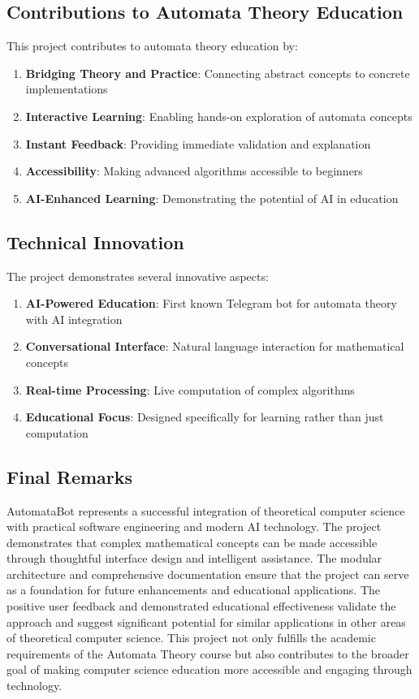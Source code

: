 \documentclass[12pt]{article}
\begin{document}
\subsection{Contributions to Automata Theory Education}
This project contributes to automata theory education by:
\begin{enumerate}
    \item \textbf{Bridging Theory and Practice}: Connecting abstract concepts to concrete implementations
    \item \textbf{Interactive Learning}: Enabling hands-on exploration of automata concepts
    \item \textbf{Instant Feedback}: Providing immediate validation and explanation
    \item \textbf{Accessibility}: Making advanced algorithms accessible to beginners
    \item \textbf{AI-Enhanced Learning}: Demonstrating the potential of AI in education
\end{enumerate}

\subsection{Technical Innovation}
The project demonstrates several innovative aspects:
\begin{enumerate}
    \item \textbf{AI-Powered Education}: First known Telegram bot for automata theory with AI integration
    \item \textbf{Conversational Interface}: Natural language interaction for mathematical concepts
    \item \textbf{Real-time Processing}: Live computation of complex algorithms
    \item \textbf{Educational Focus}: Designed specifically for learning rather than just computation
\end{enumerate}

\subsection{Final Remarks}
AutomataBot represents a successful integration of theoretical computer science with practical software engineering and modern AI technology. The project demonstrates that complex mathematical concepts can be made accessible through thoughtful interface design and intelligent assistance. The modular architecture and comprehensive documentation ensure that the project can serve as a foundation for future enhancements and educational applications. The positive user feedback and demonstrated educational effectiveness validate the approach and suggest significant potential for similar applications in other areas of theoretical computer science. This project not only fulfills the academic requirements of the Automata Theory course but also contributes to the broader goal of making computer science education more accessible and engaging through technology.
\end{document}
